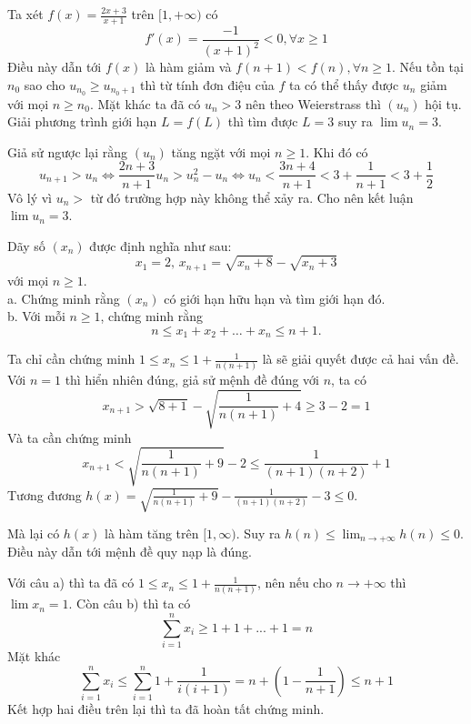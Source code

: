 \documentclass[11pt]{scrartcl}
\begin{document}
\begin{itemize}[label=, leftmargin=0em, itemsep=0.5em]
\begin{sol}
         Ta xét $f(x) = \frac{2x + 3}{x + 1}$ trên $[1,+\infty)$ có $$f'(x) = \frac{-1}{(x + 1)^2} < 0, \forall x \geq 1$$
        Điều này dẫn tới $f(x)$ là hàm giảm và $f(n + 1) < f(n), \forall n \geq 1$. Nếu tồn tại $n_0$ sao cho $u_{n_0} \geq u_{n_0 + 1}$ thì từ tính đơn điệu của $f$ ta có thể thấy được $u_n$ giảm với mọi $n \geq n_0$. Mặt khác ta đã có $u_n > 3$ nên theo Weierstrass thì $(u_n)$ hội tụ. Giải phương trình giới hạn $L = f(L)$ thì tìm được $L = 3$ suy ra $\lim u_n = 3$.


        Giả sử ngược lại rằng $(u_n)$ tăng ngặt với mọi $n \geq 1$. Khi đó có $$u_{n + 1} > u_n \Leftrightarrow \frac{2n + 3}{n + 1}u_n  > u_n^2 - u_n \Leftrightarrow u_n < \frac{3n + 4}{n + 1} < 3 + \frac{1}{n + 1} < 3 + \frac{1}{2} $$
        Vô lý vì $u_n >$ từ đó trường hợp này không thể xảy ra. Cho nên kết luận $\lim u_n = 3$.
    \end{sol}
    \begin{bt}
        Dãy số $(x_n)$ được định nghĩa như sau:
$$x_1=2,\, x_{n+1}=\sqrt{x_n+8}-\sqrt{x_n+3}$$ với mọi $n\geq 1$.\\
a. Chứng minh rằng $(x_n)$ có giới hạn hữu hạn và tìm giới hạn đó.\\
b. Với mỗi $n\geq 1$, chứng minh rằng
$$n\leq x_1+x_2+\dots +x_n\leq n+1.$$
    \end{bt}

    \begin{sol}
        Ta chỉ cần chứng minh $1 \leq x_n \leq 1 + \frac{1}{n(n + 1)}$ là sẽ giải quyết được cả hai vấn đề. Với $n = 1$ thì hiển nhiên đúng, giả sử mệnh đề đúng với $n$, ta có 
        $$x_{n + 1} > \sqrt{8 + 1} - \sqrt{\frac{1}{n(n+1)} + 4} \geq 3 - 2 = 1$$
        Và ta cần chứng minh
        $$x_{n + 1} < \sqrt{\frac{1}{n(n+1)} + 9 } - 2 \leq \frac{1}{(n+1)(n + 2)} + 1
        $$
        Tương đương $h(x) = \sqrt{\frac{1}{n(n+1)} + 9 } - \frac{1}{(n+1)(n + 2)} - 3 \leq 0$.


        Mà lại có  $h(x)$ là hàm tăng trên $[1,\infty)$. Suy ra $\displaystyle h(n) \leq \lim_{n\to +\infty} h(n) \leq 0$. Điều này dẫn tới mệnh đề quy nạp là đúng. 


        Với câu a) thì ta đã có $1 \leq x_n \leq 1 + \frac{1}{n(n + 1)}$, nên nếu cho $n \to +\infty$ thì $\lim x_n = 1$.
        Còn câu b) thì ta có 
        $$
        \sum_{i = 1}^n x_i \geq 1 + 1 + ... + 1 = n
        $$
        Mặt khác
        $$
        \sum_{i = 1}^n x_i \leq \sum_{i = 1}^n 1 + \frac{1}{i(i+1)} = n + (1 - \frac{1}{n + 1}) \leq n + 1
        $$
        Kết hợp hai điều trên lại thì ta đã hoàn tất chứng minh.


\end{sol}
\end{itemize}
\end{document}
